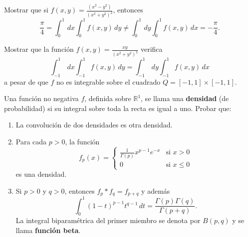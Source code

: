 \documentclass{book}
\newcommand{\rr}{\mathbb{R}}
\begin{document}
\begin{ejer}{}
 Mostrar que si $f(x,y)=\frac{(x^2-y^2)}{(x^2+y^2)^2}$, entonces
     $$\frac{\pi}{4}=\int_0^1 \,dx\int_0^1 f(x,y)\,dy\not = \int_0^1\,dy \int_0^1 f(x,y)\,dx=-\frac{\pi}{4}. $$
\end{ejer}

 \begin{ejer}{} Mostrar que la función $f(x,y)=\frac{xy}{(x^2+y^2)^2}$ verifica
   $$\int_{-1}^1 \,dx\int_{-1}^1 f(x,y)\,dy=\int_{-1}^1\,dy \int_{-1}^1 f(x,y)\,dx $$
   a pesar de que $f$ no es integrable sobre el cuadrado $Q=[-1,1]\times [-1,1]$.
	\end{ejer}

 
\begin{ejer}{} Una función no negativa $f$, definida sobre $\rr^1$, se llama una {\bf{densidad}}
   (de probabilidad) si su integral sobre toda la recta es igual a uno. Probar que: 
	\begin{enumerate}
	\item La convolución de dos densidades es otra densidad.
	\item Para cada $p>0$, la función 
     $$f_p(x)=\left\{ 
      \begin{array}{cc}
      \frac{1}{\Gamma(p)} x^{p-1} e^{-x} & \mbox{si $x>0$}\\
      0 & \mbox{si $x \leq 0$}
      \end{array}
      \right. $$
      es una densidad.
	 \item Si $p>0$ y $q>0$, entonces $f_p*f_q=f_{p+q}$ y además
      $$\int_0^1 (1-t)^{p-1} t^{q-1}\,dt=\frac{\Gamma(p) \Gamma(q)}{\Gamma(p+q)}. $$
      La integral biparamétrica del primer miembro se denota por $B(p,q)$ y se llama 
      {\bf{función beta}}.
	\end{enumerate}
	
\end{ejer}




	
	
	
	


\end{document}
